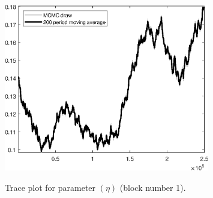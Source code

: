 \begin{figure}[H]
\centering
  \includegraphics[width=0.8\textwidth]{BRS_est_shopping/graphs/TracePlot_eta_blck_1}\\
    \caption{Trace plot for parameter $(\eta)$ (block number 1).}
\end{figure}
